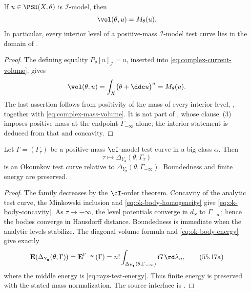 \begin{lemma}\label{lem:ok-i-model-mass-volume}
If $u\in\PSH(X,\theta)$ is $\mathcal I$-model, then
\[
                         \vol(\theta,u)=M_\theta(u).
\]
In particular, every interior level of a positive-mass
$\mathcal I$-model test curve lies in the domain of
.
\end{lemma}

\begin{proof}
The defining equality $P_\theta[u]_{\mathcal I}=u$, inserted into
\eqref{eq:complex-current-volume}, gives
\[
 \vol(\theta,u)
 =\int_X\bigl(\theta+\ddc u\bigr)^n
 =M_\theta(u).
\]
The last assertion follows from positivity of the mass of every interior
level, , together with
\eqref{eq:complex-mass-volume}.  It is not part of
, whose clause~(3) imposes positive mass at the
endpoint $\Gamma_{-\infty}$ alone; the interior statement is deduced from
that and concavity.
\end{proof}

\begin{theorem}\label{thm:ok-analytic-to-convex}
Let $\Gamma=(\Gamma_\tau)$ be a positive-mass
$\cI$-model test curve in a big class $\alpha$.
Then
\[
 \tau\longmapsto
       \Delta_{Y_\bullet}(\theta,\Gamma_\tau)
\tag{55.17}\label{eq:ok-test-curve-from-gamma}
\]
is an Okounkov test curve relative to
$\Delta_{Y_\bullet}(\theta,\Gamma_{-\infty})$.
Boundedness and finite energy are preserved.
\end{theorem}

\begin{proof}
The family decreases by the $\cI$-order theorem.
Concavity of the analytic test curve, the Minkowski inclusion and
\eqref{eq:ok-body-homogeneity} give \eqref{eq:ok-body-concavity}.
As $\tau\to-\infty$, the level potentials converge in $d_S$ to
$\Gamma_{-\infty}$; hence the bodies converge in Hausdorff distance.
Boundedness is immediate when the analytic levels stabilize.
The diagonal volume formula and \eqref{eq:ok-body-energy} give exactly
\[
 \mathbf E(\Delta_{Y_\bullet}(\theta,\Gamma))
 =\mathbf E^{\Gamma_{-\infty}}(\Gamma)
 =n!\int_{\Delta_{Y_\bullet}(\theta,\Gamma_{-\infty})}G\,\rd\lambda_n,
\tag{55.17a}\label{eq:ok-analytic-convex-energy}
\]
where the middle energy is \eqref{eq:rays-test-energy}.
Thus finite energy is preserved with the stated mass normalization.
The source interface is \cite[Theorem~10.5.2]{XiaBook}.
\end{proof}

